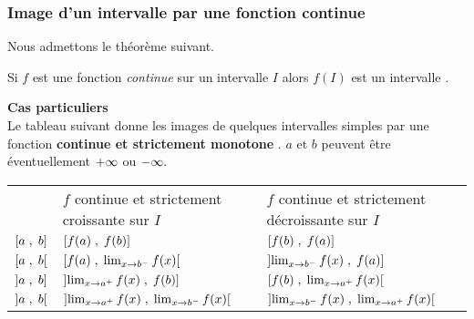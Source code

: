 \subsubsection*{Image d'un intervalle par une fonction continue}
Nous admettons le théorème suivant.
\begin{theorem}
Si $ f $ est une fonction \emph{continue} sur  un intervalle $ I $ alors $ f(I) $ est un intervalle .
\end{theorem}
\textbf{Cas particuliers}\\
Le tableau suivant donne les images de quelques intervalles simples par une fonction \textbf{continue et strictement monotone }.  $ a$ et $b $ peuvent être éventuellement $+\infty $ ou $-\infty .$ 

\begin{tabularx}{\textwidth}{|>{\centering\arraybackslash}p{1cm}|>{\centering\arraybackslash}X|>{\centering\arraybackslash}X|}
\cline{1-3}
\multicolumn{1}{|c|}{} & \multicolumn{2}{c|}{$ f(I) $} \\
\cline{2-3}
\multicolumn{1}{|c|}{$I$ intervalle} & $f$ continue et strictement croissante sur $ I $ &  $ f $ continue et strictement décroissante sur $ I $ \\
\hline
 $\left[a\;,\; b\right]$ & $\left[f(a)\;,\; f(b)\right]$ & $\left[f(b)\;,\; f(a)\right]$ \\
\hline
$ \left[a \;,\; b\right[$ & $\small \left[f(a) \;,\;  \lim_{x \to b^{-}}f(x)\right[$ & $\small\left]\lim_{x \to b^{-}}f(x)  \;, \;f(a)\right]$ \\
\hline
$ \left]a \;, \;b\right]$ & $\small\left]\lim_{x \to a^{+}}f(x) \;, \;f(b)\right]$ & $\small\left[f(b) \;,\; \lim_{x \to a^{+}}f(x)\right[$ \\
\hline
$ \left]a \;,\; b\right[$ & $\small\left]\lim_{x \to a^{+}}f(x) \;,\; \lim_{x \to b^{-}}f(x)\right[$ & $\small\left]\lim_{x \to b^{-}}f(x) \;,\; \lim_{x \to a^{+}}f(x)\right[$ \\
\hline
\end{tabularx}

